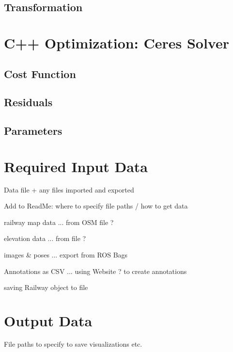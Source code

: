 \subsection{Transformation}






\section{C++ Optimization: Ceres Solver}

\subsection{Cost Function}

\subsection{Residuals}

\subsection{Parameters}



\section{Required Input Data}

Data file + any files imported and exported

Add to ReadMe: where to specify file paths / how to get data


railway map data ... from OSM file ?

elevation data ... from file ?



images \& poses ... export from ROS Bags



Annotations as CSV ... using Website ? to create annotations

saving Railway object to file


\section{Output Data}

File paths to specify to save visualizations etc.